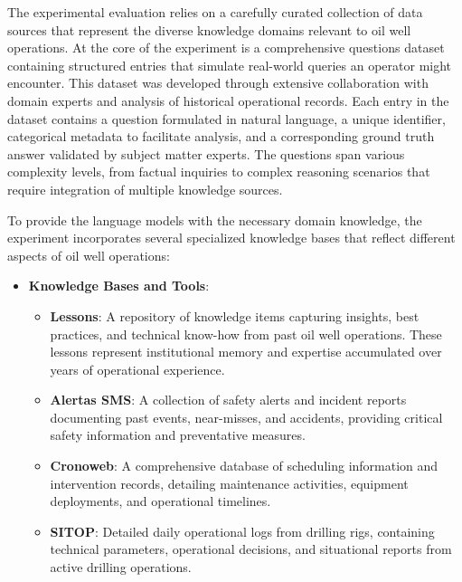                 The experimental evaluation relies on a carefully curated collection of data sources that represent the diverse knowledge domains relevant to oil well operations. At the core of the experiment is a comprehensive questions dataset containing structured entries that simulate real-world queries an operator might encounter. This dataset was developed through extensive collaboration with domain experts and analysis of historical operational records. Each entry in the dataset contains a question formulated in natural language, a unique identifier, categorical metadata to facilitate analysis, and a corresponding ground truth answer validated by subject matter experts. The questions span various complexity levels, from factual inquiries to complex reasoning scenarios that require integration of multiple knowledge sources.

            To provide the language models with the necessary domain knowledge, the experiment incorporates several specialized knowledge bases that reflect different aspects of oil well operations:

            \begin{itemize}
                \item \textbf{Knowledge Bases and Tools}:
                \begin{itemize}
                    \item \textbf{Lessons}: A repository of knowledge items capturing insights, best practices, and technical know-how from past oil well operations. These lessons represent institutional memory and expertise accumulated over years of operational experience.
                    \item \textbf{Alertas SMS}: A collection of safety alerts and incident reports documenting past events, near-misses, and accidents, providing critical safety information and preventative measures.
                    \item \textbf{Cronoweb}: A comprehensive database of scheduling information and intervention records, detailing maintenance activities, equipment deployments, and operational timelines.
                    \item \textbf{SITOP}: Detailed daily operational logs from drilling rigs, containing technical parameters, operational decisions, and situational reports from active drilling operations.
                \end{itemize}
            \end{itemize}

